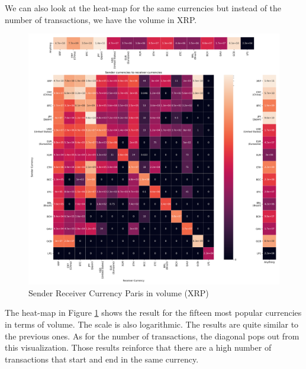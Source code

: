 We can also look at the heat-map for the same currencies but instead of the number of transactions, we have the volume in XRP.
\begin{figure}[h!]
    \centering
    \includegraphics[width = \linewidth]{sender_to_receiver_heatmap_volume.png}
    \caption{Sender Receiver Currency Paris in volume (XRP)}
    \label{fig:heatmapVolume}
\end{figure}
 The heat-map in Figure \ref{fig:heatmapVolume} shows the result for the fifteen most popular currencies in terms of volume. The scale is also logarithmic. The results are quite similar to the previous ones. As for the number of transactions, the diagonal pops out from this visualization. Those results reinforce that there are a high number of transactions that start and end in the same currency. 